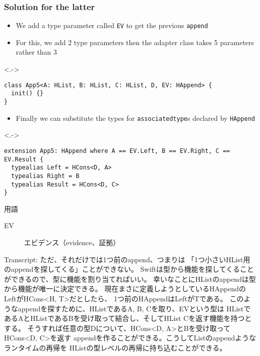\begin{frame}[fragile]
  \frametitle{Solution for the latter}

  \begin{itemize}
    \item<+-> We add a type parameter called \lstinline|EV|
    to get the previous \lstinline|append|

    \item<+-> For this, we add 2 type parameters then
    the adapter class takes 5 parameters rather than 3
  \end{itemize}

  \begin{uncoverenv}<.->
\begin{lstlisting}[style=swift]
class App5<A: HList, B: HList, C: HList, D, EV: HAppend> {
  init() {}
}
\end{lstlisting}
  \end{uncoverenv}

  \begin{itemize}
    \item<+-> Finally we can substitute the types for \lstinline|associatedtype|s
    declared by \lstinline|HAppend|
  \end{itemize}

  \begin{uncoverenv}<.->
\begin{lstlisting}[style=swift]
extension App5: HAppend where A == EV.Left, B == EV.Right, C == EV.Result {
  typealias Left = HCons<D, A>
  typealias Right = B
  typealias Result = HCons<D, C>
}
\end{lstlisting}
  \end{uncoverenv}

  \begin{notes}
    \item 用語
    \begin{description}
      \item[EV] エビデンス（evidence、証拠）
    \end{description}

    \item Transcript:
    ただ、それだけでは1つ前のappend、つまりは
    「1つ小さいHList用のappendを探してくる」ことができない。
    Swiftは型から機能を探してくることができるので、型に機能を割り当てればいい。
    幸いなことにHListのappendは型から機能が唯一に決定できる。
    現在まさに定義しようとしているHAppendのLeftがHCons<H, T>だとしたら、
    1つ前のHAppendはLeftがTである。
    このようなappendを探すために、HListであるA, B, Cを取り、EVという型は
    HListであるAとHListであるBを受け取って結合し、そしてHList Cを返す機能を持つとする。
    そうすれば任意の型Dについて、HCons<D, A>とBを受け取ってHCons<D, C>を返す
    appendを作ることができる。こうしてListのappendようなランタイムの再帰を
    HListの型レベルの再帰に持ち込むことができる。
  \end{notes}
\end{frame}

